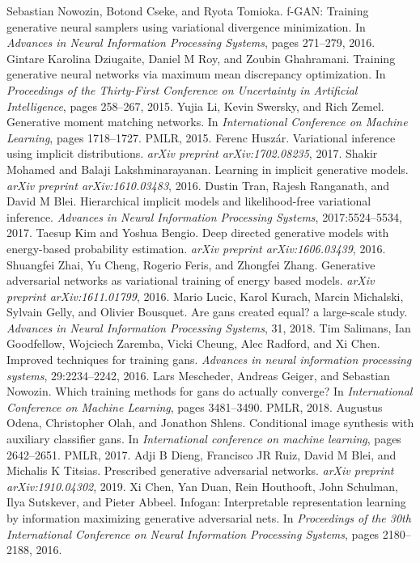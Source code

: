 \begin{chapterreferences}
 Sebastian Nowozin, Botond Cseke, and Ryota Tomioka. f-GAN: Training generative neural samplers using variational divergence minimization. In \emph{Advances in Neural Information Processing Systems}, pages 271–279, 2016.
 Gintare Karolina Dziugaite, Daniel M Roy, and Zoubin Ghahramani. Training generative neural networks via maximum mean discrepancy optimization. In \emph{Proceedings of the Thirty-First Conference on Uncertainty in Artificial Intelligence}, pages 258–267, 2015.
 Yujia Li, Kevin Swersky, and Rich Zemel. Generative moment matching networks. In \emph{International Conference on Machine Learning}, pages 1718–1727. PMLR, 2015.
 Ferenc Huszár. Variational inference using implicit distributions. \emph{arXiv preprint arXiv:1702.08235}, 2017.
 Shakir Mohamed and Balaji Lakshminarayanan. Learning in implicit generative models. \emph{arXiv preprint arXiv:1610.03483}, 2016.
 Dustin Tran, Rajesh Ranganath, and David M Blei. Hierarchical implicit models and likelihood-free variational inference. \emph{Advances in Neural Information Processing Systems}, 2017:5524–5534, 2017.
 Taesup Kim and Yoshua Bengio. Deep directed generative models with energy-based probability estimation. \emph{arXiv preprint arXiv:1606.03439}, 2016.
 Shuangfei Zhai, Yu Cheng, Rogerio Feris, and Zhongfei Zhang. Generative adversarial networks as variational training of energy based models. \emph{arXiv preprint arXiv:1611.01799}, 2016.
 Mario Lucic, Karol Kurach, Marcin Michalski, Sylvain Gelly, and Olivier Bousquet. Are gans created equal? a large-scale study. \emph{Advances in Neural Information Processing Systems}, 31, 2018.
 Tim Salimans, Ian Goodfellow, Wojciech Zaremba, Vicki Cheung, Alec Radford, and Xi Chen. Improved techniques for training gans. \emph{Advances in neural information processing systems}, 29:2234–2242, 2016.
 Lars Mescheder, Andreas Geiger, and Sebastian Nowozin. Which training methods for gans do actually converge? In \emph{International Conference on Machine Learning}, pages 3481–3490. PMLR, 2018.
 Augustus Odena, Christopher Olah, and Jonathon Shlens. Conditional image synthesis with auxiliary classifier gans. In \emph{International conference on machine learning}, pages 2642–2651. PMLR, 2017.
 Adji B Dieng, Francisco JR Ruiz, David M Blei, and Michalis K Titsias. Prescribed generative adversarial networks. \emph{arXiv preprint arXiv:1910.04302}, 2019.
 Xi Chen, Yan Duan, Rein Houthooft, John Schulman, Ilya Sutskever, and Pieter Abbeel. Infogan: Interpretable representation learning by information maximizing generative adversarial nets. In \emph{Proceedings of the 30th International Conference on Neural Information Processing Systems}, pages 2180–2188, 2016.
\end{chapterreferences}
